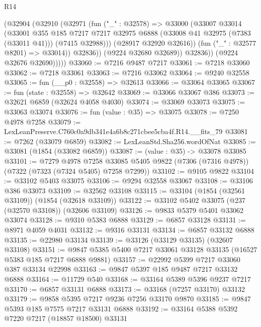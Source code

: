 \begin{lexlean}{R14}
\begin{coremodule}
                  (@32904
                    (@32910
                      (@32971
                        (fun ("_" : @32578) =>
                        @33000
                          (@33007
                            @33014
                            (@33001
                              @355
                              @185
                              @7217
                              @7217
                              @32975
                              @6888
                              (@33008 @41 @32975 (@7383 (@33011 @41)))
                              (@7415 @32988)))
                          (@28917 @32920 @32616))
                        (fun ("_" : @32577 @8201) => @33014))
                      @32836))
                  (@9224 @32680 @32689))
                @32836))
            (@9224 @32676 @32690)))))
@33060 := @7216 @9487 @7217
@33061 := @7218 @33060
@33062 := @7218 @33061
@33063 := @7216 @33062
@33064 := @9240 @32558
@33065 := fun (__p0 : @32558) => @32613
@33066 := @33064 @33065
@33067 := fun (state : @32558) => @32642
@33069 := @33066 @33067 @386
@33073 := @32621 @6859 (@32624 @4058 @4030)
@33074 := @33069 @33073
@33075 := @33063 @33074
@33076 := fun (value : @35) => @33075
@33078 := @7250 @4978 @7258
@33079 := LexLeanPreserve.C760c0a9db341e4a6b8c271cbee5cba4f.R14.__fits_79
@33081 := @7262 (@33079 @6859)
@33082 := LexLeanStd.Sha256.wordOfNat
@33085 := @33081 (@1854 (@33082 @6859))
@33087 := (value : @35) -> @33078 @33085
@33101 := @7279
    @4978
    @7258
    @33085
    @5405
    @9822
    (@7306 (@7316 @4978))
    (@7322 (@7323 (@7324 @5405) @7258 @7299))
@33102 := @9105 @9822
@33104 := @33102 @5403 @33075
@33106 := @9294 @32558 @33067
@33108 := @33106 @386 @33073
@33109 := @32562 @33108
@33115 := @33104 (@1854 (@32561 @33109)) (@1854 (@32618 @33109))
@33122 := @33102 @5402 @33075 (@237 (@32570 @33108)) (@32606 @33109)
@33126 := @9833 @5379 @5401 @33062 @33074
@33128 := @9310 @5383 @6888
@33129 := @6857 @33128
@33131 := @8971 @4059 @4031
@33132 := @9316 @33131
@33134 := @6857 @33132 @6888
@33135 := @22980 @33134
@33139 := @33126 (@33129 @33135) (@32607 @33108)
@33151 := @9847 @5385 @5400 @7217 @33061 @33128 @33135 (@16527 @5383 @185 @7217 @6888 @9881)
@33157 := @22992 @5399 @7217 @33060 @387 @33134 @22998
@33163 := @9847 @5397 @185 @9487 @7217 @33132 @6888
@33164 := @11729 @540
@33168 := @33164 @5389 @5396 @9237 @7217
@33170 := @6857 @33131 @6888
@33173 := @33168 (@7257 @33170) @33132
@33179 := @9858 @5395 @7217 @9236 @7256 @33170 @9870
@33185 := @9847 @5393 @185 @7575 @7217 @33131 @6888
@33192 := @33164 @5388 @5392 @7220 @7217 (@18857 @18500) @33131

\end{coremodule}
\end{lexlean}
